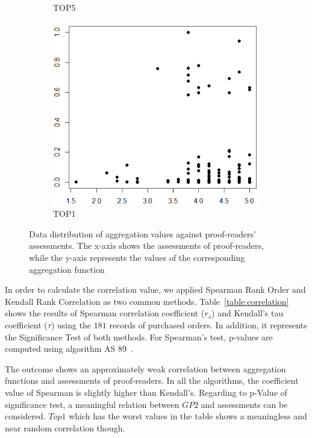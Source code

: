 \begin{figure}
\begin{subfigure}{.3\textwidth}
	\caption{TOP5}
\end{subfigure}%
\begin{subfigure}{.3\textwidth}
  \centering
	\includegraphics[width=0.99\textwidth]{figures/aggregation_plots_top1.png}
	\caption{TOP1}
\end{subfigure}
\vspace{-0.3cm}
\caption{Data distribution of aggregation values against proof-readers' assessments. The x-axis shows the assessments of proof-readers, while the y-axis represents the values of the corresponding aggregation function}
\label{fig:aggregationplot}
\vspace{-0.3cm}
\end{figure}

In order to calculate the correlation value, we applied Spearman Rank Order and Kendall Rank Correlation as two common methods. Table~\ref{table:correlation} shows the results of Spearman correlation coefficient ($r_s$) and Kendall's tau coefficient ($\tau$) using the $181$ records of purchased orders. In addition, it represents the Significance Test of both methods. For Spearman's test, p-values are computed using algorithm AS 89~\cite{as89}.

The outcome shows an approximately weak correlation between aggregation functions and assessments of proof-readers. In all the algorithms, the coefficient value of Spearman is slightly higher than Kendall's. Regarding to p-Value of significance test, a meaningful relation between $GP2$ and assessments can be considered. $Top1$ which has the worst values in the table shows a meaningless and near random correlation though.

